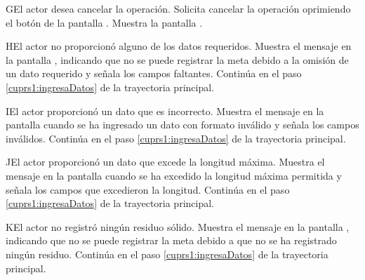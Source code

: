 \begin{UCtrayectoriaA}{G}{El actor desea cancelar la operación.}
	\UCpaso[\UCactor] Solicita cancelar la operación oprimiendo el botón  de la pantalla .
	\UCpaso[\UCsist] Muestra la pantalla  .
\end{UCtrayectoriaA} 

\begin{UCtrayectoriaA}{H}{El actor no proporcionó alguno de los datos requeridos.}
	\UCpaso[\UCsist] Muestra el mensaje  en la pantalla ,
	indicando que no se puede registrar la meta debido a la omisión de un dato requerido y señala los campos faltantes.
	\UCpaso[] Continúa en el paso \ref{cuprs1:ingresaDatos} de la trayectoria principal.
\end{UCtrayectoriaA}

\begin{UCtrayectoriaA}{I}{El actor proporcionó un dato que es incorrecto.}
	\UCpaso[\UCsist] Muestra el mensaje  en la pantalla 
	cuando se ha ingresado un dato con formato inválido y señala los campos inválidos.
	\UCpaso[] Continúa en el paso \ref{cuprs1:ingresaDatos} de la trayectoria principal.
\end{UCtrayectoriaA}
 
\begin{UCtrayectoriaA}{J}{El actor proporcionó un dato que excede la longitud máxima.}
	\UCpaso[\UCsist] Muestra el mensaje  en la pantalla 
	cuando se ha excedido la longitud máxima permitida y señala los campos que excedieron la longitud.
	\UCpaso[] Continúa en el paso \ref{cuprs1:ingresaDatos} de la trayectoria principal.
\end{UCtrayectoriaA}

\begin{UCtrayectoriaA}{K}{El actor no registró ningún residuo sólido.}
	\UCpaso[\UCsist] Muestra el mensaje  en la pantalla ,
	indicando que no se puede registrar la meta debido a que no se ha registrado ningún residuo.
	\UCpaso[] Continúa en el paso \ref{cuprs1:ingresaDatos} de la trayectoria principal.
\end{UCtrayectoriaA}